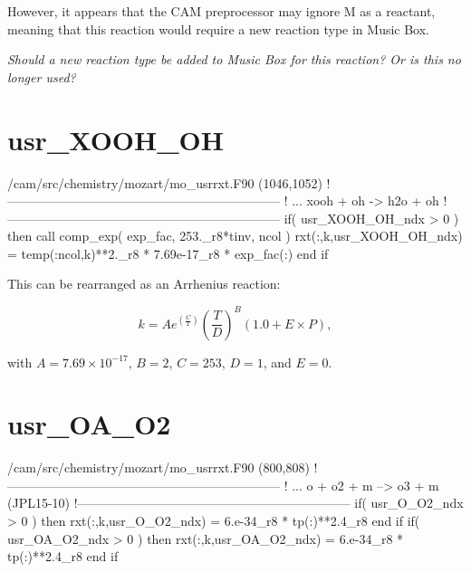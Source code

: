 \documentclass[titlepage]{article}
\begin{document}
However, it appears that the CAM preprocessor may ignore M as a reactant, meaning that
this reaction would require a new reaction type in Music Box.

\vspace{20px}
\textit{\Large Should a new reaction type be added to Music Box for this reaction? Or is
this no longer used?}


\section{usr\_XOOH\_OH}

\begin{blockcode}[commandchars=\\\{\}]
\color{gray}/cam/src/chemistry/mozart/mo_usrrxt.F90 (1046,1052)
!-----------------------------------------------------------------
!       ... xooh + oh -> h2o + oh
!-----------------------------------------------------------------
       if( usr_XOOH_OH_ndx > 0 ) then
          call comp_exp( exp_fac, 253._r8*tinv, ncol )
          rxt(:,k,usr_XOOH_OH_ndx) = temp(:ncol,k)**2._r8 * 7.69e-17_r8 * exp_fac(:)
       end if
\end{blockcode}

This can be rearranged as an Arrhenius reaction:

\begin{equation}
k = Ae^{(\frac{C}{T})}(\frac{T}{D})^B(1.0+E \times P),
\end{equation}

\noindent with $A = 7.69 \times 10^{-17}$, $B = 2$, $C = 253$, $D = 1$, and $E = 0$.



\section{usr\_OA\_O2}

\begin{blockcode}[commandchars=\\\{\}]
\color{gray}/cam/src/chemistry/mozart/mo_usrrxt.F90 (800,808)
!-----------------------------------------------------------------
! ... o + o2 + m --> o3 + m (JPL15-10)
!-----------------------------------------------------------------
       if( usr_O_O2_ndx > 0 ) then
          rxt(:,k,usr_O_O2_ndx) = 6.e-34_r8 * tp(:)**2.4_r8
       end if
       if( usr_OA_O2_ndx > 0 ) then
          rxt(:,k,usr_OA_O2_ndx) = 6.e-34_r8 * tp(:)**2.4_r8
       end if
\end{blockcode}
\end{document}
